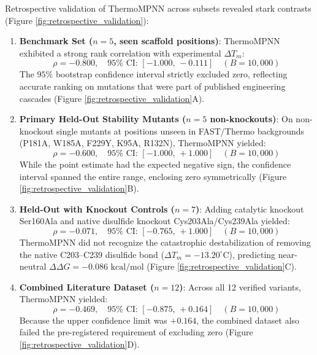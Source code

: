\documentclass[11pt,a4paper]{article}
\begin{document}
Retrospective validation of ThermoMPNN across subsets revealed stark contrasts (Figure \ref{fig:retrospective_validation}):
\begin{enumerate}
    \item \textbf{Benchmark Set ($n=5$, seen scaffold positions)}: ThermoMPNN exhibited a strong rank correlation with experimental $\Delta T_m$:
    \begin{equation}
        \rho = -0.800, \quad 95\%\text{ CI: } [-1.000, \, -0.111] \quad (B = 10,000)
    \end{equation}
    The $95\%$ bootstrap confidence interval strictly excluded zero, reflecting accurate ranking on mutations that were part of published engineering cascades (Figure \ref{fig:retrospective_validation}A).
    \item \textbf{Primary Held-Out Stability Mutants ($n=5$ non-knockouts)}: On non-knockout single mutants at positions unseen in FAST/Thermo backgrounds (P181A, W185A, F229Y, K95A, R132N), ThermoMPNN yielded:
    \begin{equation}
        \rho = -0.600, \quad 95\%\text{ CI: } [-1.000, \, +1.000] \quad (B = 10,000)
    \end{equation}
    While the point estimate had the expected negative sign, the confidence interval spanned the entire range, enclosing zero symmetrically (Figure \ref{fig:retrospective_validation}B).
    \item \textbf{Held-Out with Knockout Controls ($n=7$)}: Adding catalytic knockout Ser160Ala and native disulfide knockout Cys203Ala/Cys239Ala yielded:
    \begin{equation}
        \rho = -0.071, \quad 95\%\text{ CI: } [-0.765, \, +1.000] \quad (B = 10,000)
    \end{equation}
    ThermoMPNN did not recognize the catastrophic destabilization of removing the native C203--C239 disulfide bond ($\Delta T_m = -13.20^\circ\text{C}$), predicting near-neutral $\Delta\Delta G = -0.086\text{ kcal/mol}$ (Figure \ref{fig:retrospective_validation}C).
    \item \textbf{Combined Literature Dataset ($n=12$)}: Across all 12 verified variants, ThermoMPNN yielded:
    \begin{equation}
        \rho = -0.469, \quad 95\%\text{ CI: } [-0.875, \, +0.164] \quad (B = 10,000)
    \end{equation}
    Because the upper confidence limit was $+0.164$, the combined dataset also failed the pre-registered requirement of excluding zero (Figure \ref{fig:retrospective_validation}D).
\end{enumerate}
\end{document}

